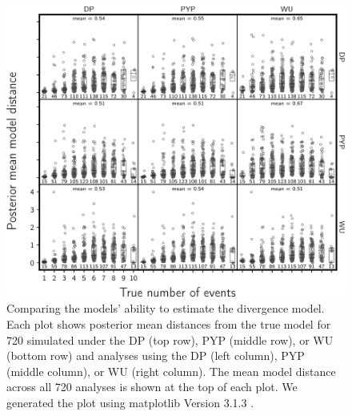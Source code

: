 \documentclass[letterpaper,12pt]{article}
\begin{document}
\begin{figure}[htbp]
    \begin{center}
        \includegraphics[width=\textwidth,height=\textheight,keepaspectratio]{../images/from-project-repo/infer-columns-by-data-rows-model-distance-box-cropped.pdf}
        \captionsetup{listformat=figList}
        \caption{
        Comparing the models' ability to estimate the divergence model.
        Each plot shows posterior mean distances from the true model
        for 720 \datasets
        simulated under the
        DP (top row),
        PYP (middle row),
        or
        WU (bottom row)
        and analyses using the
        DP (left column),
        PYP (middle column),
        or
        WU (right column).
        The mean model distance across all 720 analyses is shown at the top of
        each plot.
        We generated the plot using matplotlib Version 3.1.3
        \citep{matplotlib}.
        }
        \label{fig:modeldistancegrid}
    \end{center}
\end{figure}
\end{document}
